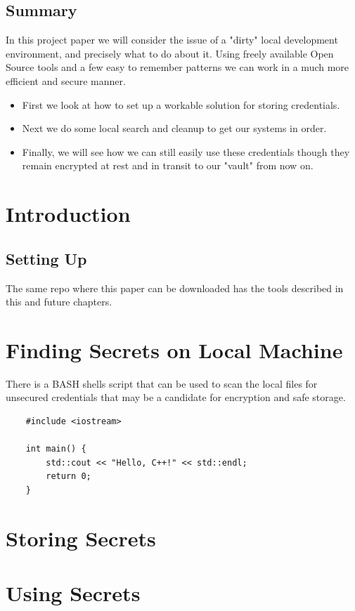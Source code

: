 \documentclass[11pt]{report}
\begin{document}
	\section*{Summary}
    In this project paper we will consider the issue of a "dirty" local development
    environment, and precisely what to do about it. Using freely available
    Open Source tools and a few easy to remember patterns we can work in a
    much more efficient and secure manner.

    \begin{itemize}
    	\item First we look at how to set up a workable solution for storing credentials.
		\item Next we do some local search and cleanup to get our systems in order.
		\item Finally, we will see how we can still easily use these credentials though
			they remain encrypted at rest and in transit to our "vault" from now on.
    \end{itemize}

	\cleardoublepage


	\tableofcontents
	\thispagestyle{empty}
	\cleardoublepage
	\setcounter{page}{1}


	\chapter{Introduction}

    \lipsum[1]

	\section{Setting Up}

	The same repo where this paper can be downloaded has the tools described in this and future chapters.

\chapter{Finding Secrets on Local Machine}

There is a BASH shells script that can be used to scan the local files for
unsecured credentials that may be a candidate for encryption and safe storage.

\begin{verbatim}
    #include <iostream>

    int main() {
        std::cout << "Hello, C++!" << std::endl;
        return 0;
    }
\end{verbatim}

\chapter{Storing Secrets}

	\lipsum[1]

	\chapter{Using Secrets}

	\lipsum[1]
\end{document}

